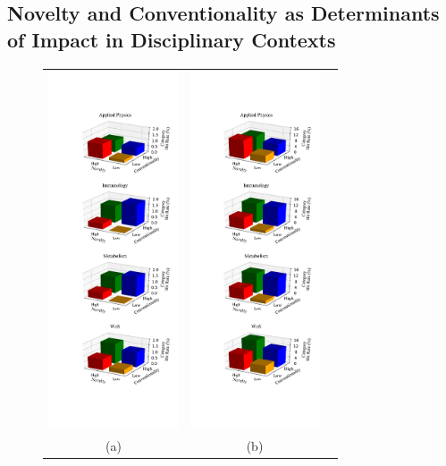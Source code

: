 \documentclass[NETN]{stjour}
\begin{document}
\subsection{Novelty and Conventionality as Determinants of Impact in Disciplinary Contexts}


\begin{figure}
\centering
\begin{tabular}{ccc}
\includegraphics[width=1.5in]{Fig2H01N10.pdf} & \includegraphics[width=1.5in]{Fig2H10N10.pdf} \\
(a) & (b) \\
\end{tabular}

\end{figure}
\end{document}
